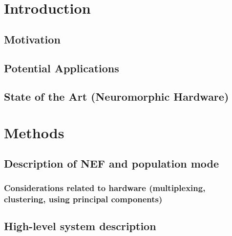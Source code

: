 \documentclass[english]{article}
\begin{document}
\lstset{basicstyle=\footnotesize}

\section{Introduction}

\subsection{Motivation}

\subsection{Potential Applications}

\subsection{State of the Art (Neuromorphic Hardware)}

\section{Methods}

\subsection{Description of NEF and population mode}

\subsubsection{Considerations related to hardware (multiplexing, clustering, using principal components)}


\subsection{High-level system description}
\end{document}
